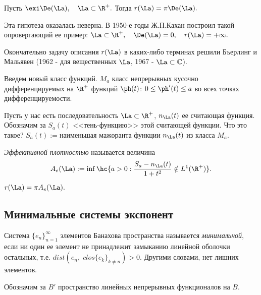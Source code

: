 \documentclass{article}
\begin{document}
\begin{hypotetic}[Шварца]
  Пусть $\exi\De(\La),\quad\La\subset\R ^{+}.$ Тогда
  $r(\La)=\pi\De(\La).$
\end{hypotetic}

Эта гипотеза оказалась неверна. В 1950-е годы Ж.П.Кахан построил
такой опровергающий ее пример:
$\La\subset\R ^{+},\quad\De(\La)=0,\quad
r(\La)=+\infty.$

Окончательно задачу описания $r(\La)$ в каких-либо терминах
решили Бъерлинг и Мальявен (1962 - для вещественных $\La$,
1967 - $\La\subset\mathbb{C}$).

Введем новый класс функций. $M_a$ класс непрерывных кусочно
дифференцируемых на $\R ^{+}$ функций $\ph(t)$:
$0\le\ph'(t)\le a$ во всех точках дифференцируемости.

\begin{wrapfigure}[7]{l}{5.4cm}
\end{wrapfigure}

Пусть у нас есть последовательность
$\La\subset\R ^{+}$, $n_{\La}(t)$ ее считающая
функция. Обозначим за $S_a(t)$ <<тень-функцию>> этой считающей
функции. Что это такое? $S_a(t):=$наименьшая мажоранта функции
$n_{\La}(t)$ из класса $M_a$.

\begin{df}
  \emph{Эффективной плотностью} называется
  величина
  \begin{equation*}
    A_e(\La):=\inf\hc{a>0:\frac{S_a-n_{\La}(t)}{1+t^2}\notin
    L^1(\R ^{+})}.
  \end{equation*}
\end{df}

\begin{theorem}
$r(\La)=\pi A_e(\La).$
\end{theorem}

\subsection{Минимальные системы экспонент}

\begin{df}
  Система $\{e_n\}_{n=1}^{\infty}$ элементов Банахова пространства
  называется \emph{минимальной}, если ни один ее элемент не
  принадлежит замыканию линейной оболочки остальных, т.е.
  $dist(e_n,\;clos \{e_k\}_{k\neq n})>0$. Другими словами, нет лишних
  элементов.
\end{df}

\begin{denote}
  Обозначим за $B'$ пространство линейных непрерывных функционалов
  на $B.$
\end{denote}
\end{document}
